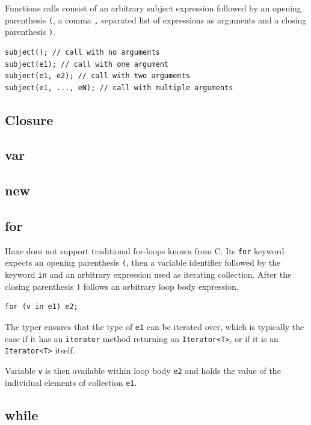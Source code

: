 \documentclass{article}
\newcommand{\type}[1]{\texttt{#1}}
\newcommand{\expr}[1]{\texttt{#1}}
\begin{document}
Functions calls consist of an arbitrary subject expression followed by an opening parenthesis \expr{(}, a comma \expr{,} separated list of expressions as arguments and a closing parenthesis \expr{)}.

\begin{lstlisting}
subject(); // call with no arguments
subject(e1); // call with one argument
subject(e1, e2); // call with two arguments
subject(e1, ..., eN); // call with multiple arguments
\end{lstlisting}




\subsection{Closure}
\label{Closure}
\label{function}

\subsection{var}
\label{var}

\subsection{new}
\label{new}

\subsection{for}

Haxe does not support traditional for-loops known from C. Its \expr{for} keyword expects an opening parenthesis \expr{(}, then a variable identifier followed by the keyword \expr{in} and an arbitrary expression used as iterating collection. After the closing parenthesis \expr{)} follows an arbitrary loop body expression.

\begin{lstlisting}
for (v in e1) e2;
\end{lstlisting}

The typer ensures that the type of \expr{e1} can be iterated over, which is typically the case if it has an \expr{iterator} method returning an \type{Iterator<T>}, or if it is an \type{Iterator<T>} itself.

Variable \expr{v} is then available within loop body \expr{e2} and holds the value of the individual elements of collection \expr{e1}.

\subsection{while}
\label{while}
\end{document}
